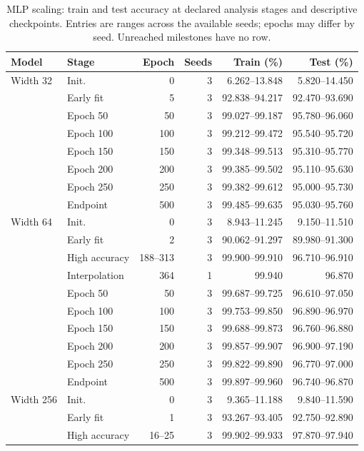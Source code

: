 \FloatBarrier
\begin{table}[!htbp]\centering
\caption{MLP scaling: train and test accuracy at declared analysis stages and descriptive checkpoints. Entries are ranges across the available seeds; epochs may differ by seed. Unreached milestones have no row.}\label{tab:perf-1-0}
\small\setlength{\tabcolsep}{4pt}
\begin{tabular}{llrrrr}\toprule
Model & Stage & Epoch & Seeds & Train (\%) & Test (\%)\\\midrule
Width 32 & Init. & 0 & 3 & 6.262--13.848 & 5.820--14.450\\
 & Early fit & 5 & 3 & 92.838--94.217 & 92.470--93.690\\
 & Epoch 50 & 50 & 3 & 99.027--99.187 & 95.780--96.060\\
 & Epoch 100 & 100 & 3 & 99.212--99.472 & 95.540--95.720\\
 & Epoch 150 & 150 & 3 & 99.348--99.513 & 95.310--95.770\\
 & Epoch 200 & 200 & 3 & 99.385--99.502 & 95.110--95.630\\
 & Epoch 250 & 250 & 3 & 99.382--99.612 & 95.000--95.730\\
 & Endpoint & 500 & 3 & 99.485--99.635 & 95.030--95.760\\
\midrule
Width 64 & Init. & 0 & 3 & 8.943--11.245 & 9.150--11.510\\
 & Early fit & 2 & 3 & 90.062--91.297 & 89.980--91.300\\
 & High accuracy & 188--313 & 3 & 99.900--99.910 & 96.710--96.910\\
 & Interpolation & 364 & 1 & 99.940 & 96.870\\
 & Epoch 50 & 50 & 3 & 99.687--99.725 & 96.610--97.050\\
 & Epoch 100 & 100 & 3 & 99.753--99.850 & 96.890--96.970\\
 & Epoch 150 & 150 & 3 & 99.688--99.873 & 96.760--96.880\\
 & Epoch 200 & 200 & 3 & 99.857--99.907 & 96.900--97.190\\
 & Epoch 250 & 250 & 3 & 99.822--99.890 & 96.770--97.000\\
 & Endpoint & 500 & 3 & 99.897--99.960 & 96.740--96.870\\
\midrule
Width 256 & Init. & 0 & 3 & 9.365--11.188 & 9.840--11.590\\
 & Early fit & 1 & 3 & 93.267--93.405 & 92.750--92.890\\
 & High accuracy & 16--25 & 3 & 99.902--99.933 & 97.870--97.940\\

\end{tabular}
\end{table}
